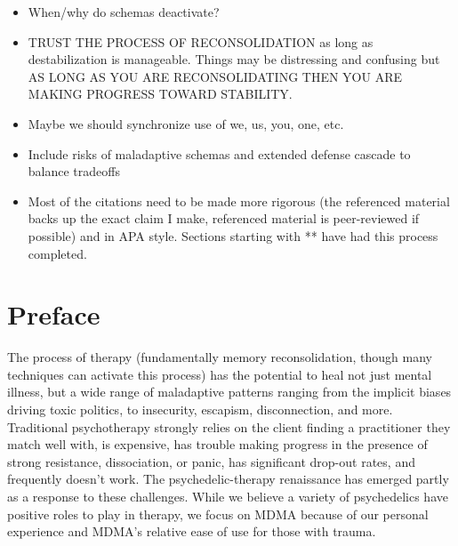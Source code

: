 \documentclass[12pt,letterpaper]{book}
\begin{document}
\begin{itemize}
    \item When/why do schemas deactivate?
    \item TRUST THE PROCESS OF RECONSOLIDATION as long as destabilization is manageable. Things may be distressing and confusing but AS LONG AS YOU ARE RECONSOLIDATING THEN YOU ARE MAKING PROGRESS TOWARD STABILITY.
    \item Maybe we should synchronize use of we, us, you, one, etc.
    \item Include risks of maladaptive schemas and extended defense cascade to balance tradeoffs
    \item Most of the citations need to be made more rigorous (the referenced material backs up the exact claim I make, referenced material is peer-reviewed if possible) and in APA style. Sections starting with ** have had this process completed.
\end{itemize}
\section*{Preface}


The process of therapy (fundamentally memory reconsolidation, though many techniques can activate this process) has the potential to heal not just mental illness, but a wide range of maladaptive patterns ranging from the implicit biases driving toxic politics, to insecurity, escapism, disconnection, and more. Traditional psychotherapy strongly relies on the client finding a practitioner they match well with, is expensive, has trouble making progress in the presence of strong resistance, dissociation, or panic, has significant drop-out rates, and frequently doesn't work. The psychedelic-therapy renaissance has emerged partly as a response to these challenges. While we believe a variety of psychedelics have positive roles to play in therapy, we focus on MDMA because of our personal experience and MDMA's relative ease of use for those with trauma.
\end{document}
